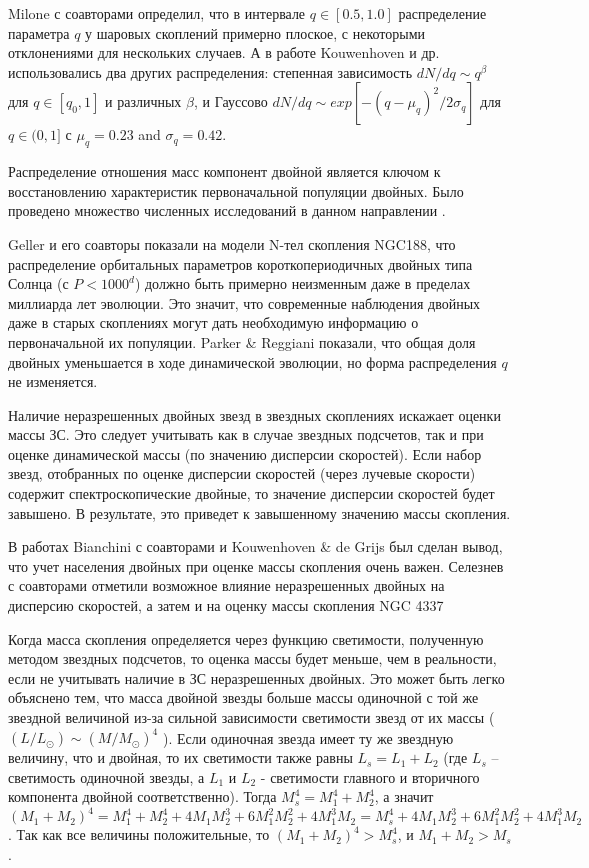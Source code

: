 \documentclass[a4paper,12pt]{article}
\begin{document}
Milone \cite{Milone2012} с соавторами определил, что  в интервале $q\in[0.5,1.0]$ распределение параметра $q$ у шаровых скоплений примерно плоское, с некоторыми отклонениями для нескольких случаев. А в работе Kouwenhoven и др. \cite{Kouwenhoven} использовались два других распределения: степенная зависимость $dN/dq \sim q^{\beta}$ для $q\in[q_0,1]$ и различных $\beta$, и Гауссово $dN/dq \sim exp[-(q-\mu_q)^2/2\sigma_q]$ для $q\in(0,1]$ с $\mu_q=0.23$ and $\sigma_q=0.42$.

Распределение отношения масс компонент двойной является ключом к восстановлению характеристик первоначальной популяции двойных. Было проведено множество численных исследований в данном направлении \cite{Kroupa2011,Geller2013,PR}.

Geller  и его соавторы \cite{Geller2013} показали на модели N-тел скопления NGC188, что распределение орбитальных параметров короткопериодичных двойных типа Солнца (с $P<1000^d$) должно быть примерно неизменным даже в пределах миллиарда лет эволюции. Это значит, что современные наблюдения двойных даже в старых скоплениях могут дать необходимую информацию о первоначальной их популяции. Parker \& Reggiani \cite{PR} показали, что общая доля двойных уменьшается в ходе динамической эволюции, но форма распределения $q$ не изменяется.  

Наличие неразрешенных двойных звезд в звездных скоплениях искажает оценки массы ЗС. Это следует учитывать как в случае звездных подсчетов, так и при оценке динамической массы (по значению дисперсии скоростей). Если набор звезд, отобранных по  оценке дисперсии скоростей (через лучевые скорости) содержит спектроскопические двойные, то значение дисперсии скоростей будет завышено. В результате, это приведет к завышенному значению массы скопления.

В работах Bianchini с соавторами \cite{Bianchini} и Kouwenhoven \& de Grijs \cite{KdeG} был сделан вывод, что учет населения двойных при оценке массы скопления очень важен. Селезнев с соавторами \cite{4337} отметили возможное влияние неразрешенных двойных на дисперсию скоростей, а затем и на оценку массы скопления NGC 4337

Когда масса скопления определяется через функцию светимости, полученную методом звездных подсчетов, то оценка массы будет меньше, чем в реальности, если не учитывать наличие в ЗС неразрешенных двойных. Это может быть легко объяснено тем, что масса двойной звезды больше массы одиночной с той же звездной величиной из-за сильной зависимости светимости звезд от их массы ($(L/L_{\odot})\sim(M/M_{\odot})^4$ \cite{CO}). 
Если одиночная звезда имеет ту же звездную величину, что и двойная, то их светимости также равны $L_s=L_1+L_2$ (где $L_s$ -- светимость одиночной звезды, а  $L_1$ и $L_2$ - светимости главного и вторичного компонента двойной соответственно). Тогда $M_s^4=M_1^4+M_2^4$, а значит $(M_1+M_2)^4=M_1^4+M_2^4+4M_1M_2^3+6M_1^2M_2^2+4M_1^3M_2=M_s^4+4M_1M_2^3+6M_1^2M_2^2+4M_1^3M_2$.
 Так как все величины положительные, то $(M_1+M_2)^4>M_s^4$, и $M_1+M_2>M_s$.
\end{document}
